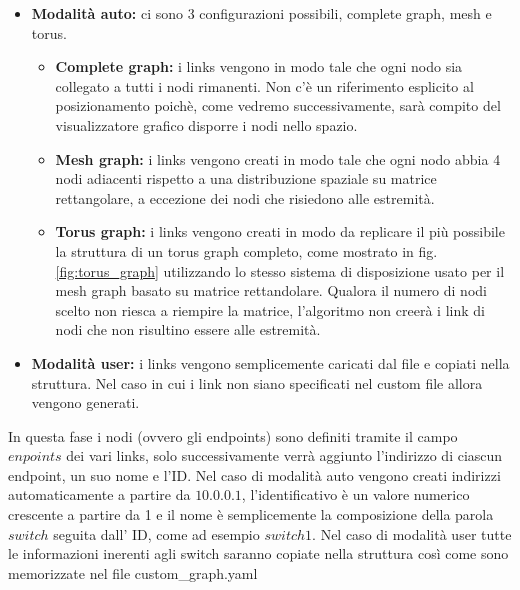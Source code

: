 \documentclass[binding=0.6cm]{sapthesis}
\begin{document}
\begin{itemize}
    \item \textbf{Modalità auto:} ci sono 3 configurazioni possibili, complete graph, mesh e torus.
    \begin{itemize}
        \item \textbf{Complete graph:} i links vengono in modo tale che ogni nodo sia collegato a tutti i nodi rimanenti. Non c'è un riferimento esplicito al posizionamento poichè, come vedremo successivamente, sarà compito del visualizzatore grafico disporre i nodi nello spazio.
        \item \textbf{Mesh graph: } i links vengono creati in modo tale che ogni nodo abbia 4 nodi adiacenti rispetto a una distribuzione spaziale su matrice rettangolare, a eccezione dei nodi che risiedono alle estremità.
        \item \textbf{Torus graph: } i links vengono creati in modo da replicare il più possibile la struttura di un torus graph completo, come mostrato in fig. \ref{fig:torus_graph} utilizzando lo stesso sistema di disposizione usato per il mesh graph basato su matrice rettandolare.
        Qualora il numero di nodi scelto non riesca a riempire la matrice, l'algoritmo non creerà i link di nodi che non risultino essere alle estremità.
    \end{itemize} 
    \item \textbf{Modalità user:} i links vengono semplicemente caricati dal file e copiati nella struttura. Nel caso in cui i link non siano specificati nel custom file allora vengono generati.
\end{itemize}
In questa fase i nodi (ovvero gli endpoints) sono definiti tramite il campo \(enpoints\) dei vari links, solo successivamente verrà aggiunto l'indirizzo di ciascun endpoint, un suo nome e l'ID.
Nel caso di modalità auto vengono creati indirizzi automaticamente a partire da \(10.0.0.1\), l'identificativo è un valore numerico crescente a partire da 1 e il nome è semplicemente la composizione
della parola \(switch\) seguita dall' ID, come ad esempio \(switch1\).
Nel caso di modalità user tutte le informazioni inerenti agli switch saranno copiate nella struttura così come sono memorizzate nel file custom\_graph.yaml
\end{document}
